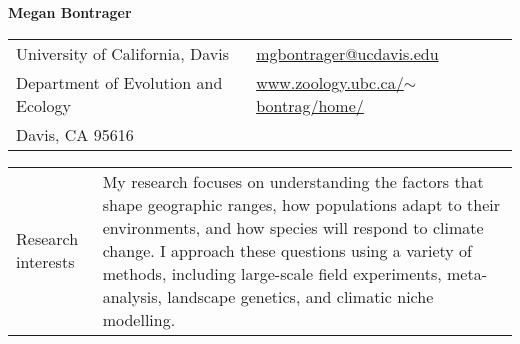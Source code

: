 \documentclass[letterpaper,11pt,oneside]{article}
\begin{document}

\noindent  \LARGE{\textbf{Megan Bontrager}}  \\
\normalsize

\bigskip



\noindent \begin{tabular}{@{} p{8cm} >{\raggedleft\arraybackslash}p{8.5cm}}
University of California, Davis & {\href{mailto:mgbontrager@ucdavis.edu}{mgbontrager@ucdavis.edu}} \\
Department of Evolution and Ecology & {\href{www.zoology.ubc.ca/$\sim$bontrag/home/}{www.zoology.ubc.ca/$\sim$bontrag/home/}} \\
Davis, CA 95616 & \\
\end{tabular}
\vspace{1em}


\noindent\hrulefill 

\bigskip


\noindent \begin{tabular}{@{} p{3cm} p{13.5cm}}
\Large{Research interests} & My research focuses on understanding the factors that shape geographic ranges, how populations adapt to their environments, and how species will respond to climate change. I approach these questions using a variety of methods, including large-scale field experiments, meta-analysis, landscape genetics, and climatic niche modelling. \\
\end{tabular}

\bigskip
\bigskip
\end{document}
